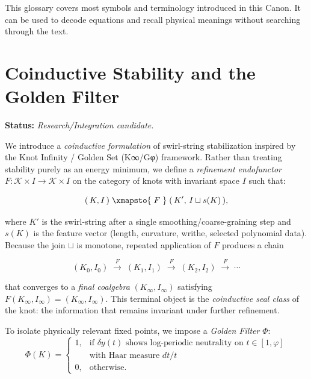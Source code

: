         This glossary covers most symbols and terminology introduced in this Canon. It can be used to decode equations and recall physical meanings without searching through the text.





    \section{Coinductive Stability and the Golden Filter}
        \label{sec:coinductive-golden}

        \noindent
        \textbf{Status:} \emph{Research/Integration candidate.}

        \medskip

        \noindent
        We introduce a \emph{coinductive formulation} of swirl-string stabilization inspired by the
        Knot Infinity / Golden Set (K∞/Gφ) framework.
        Rather than treating stability purely as an energy minimum, we define a
        \emph{refinement endofunctor}
        \(
        F: \mathcal{K}\times I \to \mathcal{K}\times I
        \)
        on the category of knots with invariant space \(I\)
        such that:

        \[
            (\,K,I\,) \;\xmapsto{\;F\;}\; (\,K',\, I \sqcup s(K)\,),
        \]

        where \(K'\) is the swirl-string after a single smoothing/coarse-graining step
        and \(s(K)\) is the feature vector (length, curvature, writhe, selected polynomial data).
        Because the join \(\sqcup\) is monotone, repeated application of \(F\)
        produces a chain

        \[
            (K_0,I_0) \;\xrightarrow{F}\; (K_1,I_1)
            \;\xrightarrow{F}\; (K_2,I_2) \;\xrightarrow{F}\; \cdots
        \]

        that converges to a \emph{final coalgebra} \((K_\infty,I_\infty)\) satisfying
        \(F(K_\infty,I_\infty)=(K_\infty,I_\infty)\).
        This terminal object is the \emph{coinductive seal class} of the knot: the information
        that remains invariant under further refinement.

        \medskip

        \noindent
        To isolate physically relevant fixed points, we impose a
        \emph{Golden Filter} \(\Phi\):
        \[
            \Phi(K) =
            \begin{cases}
                1, & \text{if } \delta y(t) \text{ shows log-periodic neutrality on } t\!\in\![1,\varphi] \\
                & \text{with Haar measure } dt/t
                \\[4pt]
                0, & \text{otherwise.}
            \end{cases}
        \]

